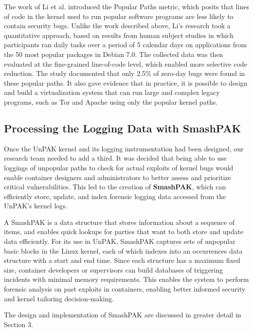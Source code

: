 The work of Li et al. \cite{Lock-in-Pop} introduced the Popular Paths metric, which posits that lines of code in the kernel used to run popular software programs are less likely to contain security bugs. 
Unlike the work described above, Li’s research  took a quantitative approach, based on results from human subject studies in which participants ran daily tasks over a period of 5 calendar days on 
applications from the 50 most popular packages in Debian 7.0. The collected data was then evaluated at the fine-grained line-of-code level, which enabled more selective code reduction. 
The study documented that only 2.5\% of zero-day bugs were found in these popular paths. It also gave evidence that in practice, 
it is possible to design and build a virtualization system that can run large and complex legacy programs, such as Tor and Apache using only the popular kernel paths.  

\subsection{Processing the Logging Data with SmashPAK}
\label{sec.motivation.smashpak}
Once the UnPAK kernel and its logging instrumentation had been designed,  
our research team needed to add a third. It was decided that being able to use loggings of unpopular paths to check for actual exploits of kernel bugs would enable container designers 
and administrators to better assess and prioritize critical vulnerabilities. This led to the creation of \textbf{SmashPAK}, which can efficiently store, update, and index forensic logging data accessed 
from the UnPAK’s kernel logs. 

A SmashPAK is a data structure that stores information about a sequence of items, and enables quick lookups for parties that want to both store and update data efficiently. 
For its use in UnPAK, SmashPAK captures sets of unpopular basic blocks in the Linux kernel, each of which indexes into an occurrences data structure with a start and end time. 
Since each structure has a maximum fixed size, container developers or supervisors can build databases of triggering incidents with minimal memory requirements. 
This enables the system to perform forensic analysis on past exploits in containers, enabling better informed security and kernel tailoring decision-making.

The design and implementation of SmashPAK are discussed in greater detail in Section 3. 